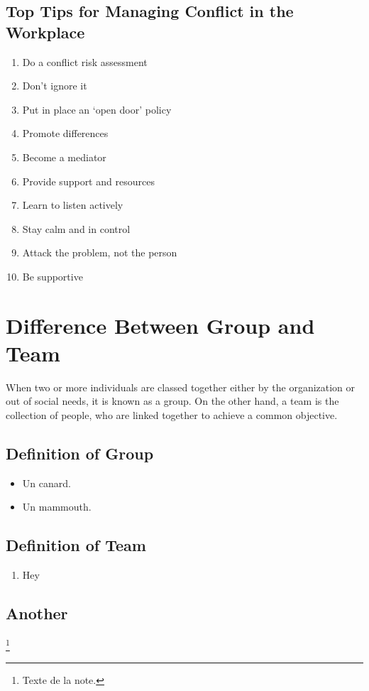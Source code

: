\documentclass[a4paper,12pt]{report} %
\begin{document}
\section{Top Tips for Managing Conflict in the Workplace}
\begin{enumerate}
\item Do a conflict risk assessment
\item Don’t ignore it
\item Put in place an ‘open door’ policy
\item Promote differences
\item Become a mediator
\item Provide support and resources
\item Learn to listen actively
\item Stay calm and in control
\item Attack the problem, not the person
\item Be supportive
\end{enumerate}

\chapter{Difference Between Group and Team}\newpage
When two or more individuals are classed together either by the organization or out of social needs, it is known as a group.
On the other hand, a team is the collection of people, who are linked together to achieve a common objective.
\section{Definition of Group}
\begin{itemize}
\item Un canard.
\item Un mammouth.
\end{itemize}
\section{Definition of Team}
\begin{enumerate}
\item Hey
\end{enumerate}
\section{Another}


\footnote{Texte de la note.}
\end{document}
